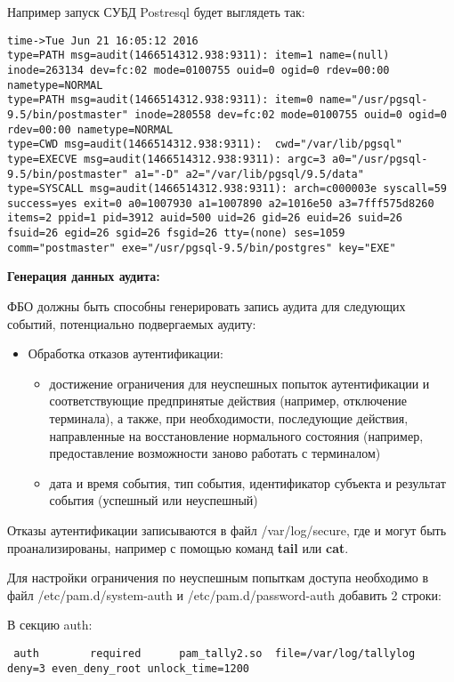 \documentclass[a4paper,10pt,twoside]{article}
\begin{document}
Например запуск СУБД Postresql будет выглядеть так:
\begin{verbatim}
time->Tue Jun 21 16:05:12 2016
type=PATH msg=audit(1466514312.938:9311): item=1 name=(null) inode=263134 dev=fc:02 mode=0100755 ouid=0 ogid=0 rdev=00:00 nametype=NORMAL
type=PATH msg=audit(1466514312.938:9311): item=0 name="/usr/pgsql-9.5/bin/postmaster" inode=280558 dev=fc:02 mode=0100755 ouid=0 ogid=0 rdev=00:00 nametype=NORMAL
type=CWD msg=audit(1466514312.938:9311):  cwd="/var/lib/pgsql"
type=EXECVE msg=audit(1466514312.938:9311): argc=3 a0="/usr/pgsql-9.5/bin/postmaster" a1="-D" a2="/var/lib/pgsql/9.5/data"
type=SYSCALL msg=audit(1466514312.938:9311): arch=c000003e syscall=59 success=yes exit=0 a0=1007930 a1=1007890 a2=1016e50 a3=7fff575d8260 items=2 ppid=1 pid=3912 auid=500 uid=26 gid=26 euid=26 suid=26 fsuid=26 egid=26 sgid=26 fsgid=26 tty=(none) ses=1059 comm="postmaster" exe="/usr/pgsql-9.5/bin/postgres" key="EXE"
\end{verbatim} 

 \textbf{Генерация данных аудита:}

ФБО должны быть способны генерировать запись аудита для следующих событий, потенциально подвергаемых аудиту:

\begin{itemize}
 \item Обработка отказов аутентификации:
 \begin{itemize}
  \item достижение ограничения для неуспешных попыток аутентификации и соответствующие предпринятые действия (например, отключение терминала), а также, при необходимости, последующие действия, направленные на восстановление нормального состояния (например, предоставление возможности заново работать с терминалом)
\item дата и время события, тип события, идентификатор субъекта и результат события (успешный или неуспешный)
 \end{itemize}
\end{itemize}

Отказы аутентификации записываются в файл /var/log/secure, где и могут быть проанализированы, например с помощью команд \textbf{tail} или \textbf{cat}.

Для настройки ограничения по неуспешным попыткам доступа необходимо в файл /etc/pam.d/system-auth и /etc/pam.d/password-auth добавить 2 строки:

В секцию auth:
\begin{verbatim}
 auth        required      pam_tally2.so  file=/var/log/tallylog deny=3 even_deny_root unlock_time=1200
\end{verbatim} 
\end{document}
